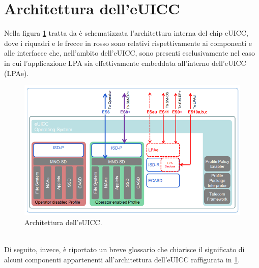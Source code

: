 \documentclass[10pt, twoside, openany]{book}
\begin{document}
\section{Architettura dell'eUICC}
Nella figura \ref{fig:eUICC-arch} tratta da \cite{GSMA-docs} è schematizzata l'architettura interna del chip eUICC, dove i riquadri e le frecce in rosso sono relativi rispettivamente ai componenti e alle interfacce che, nell'ambito dell'eUICC, sono presenti esclusivamente nel caso in cui l'applicazione LPA sia effettivamente embeddata all'interno dell'eUICC (LPAe).
\begin{figure}
\includegraphics[width=\linewidth]{eUICC-arch.png}
\caption{Architettura dell'eUICC.}
\label{fig:eUICC-arch}
\end{figure}
\\Di seguito, invece, è riportato un breve glossario che chiarisce il significato di alcuni componenti appartenenti all'architettura dell'eUICC raffigurata in \ref{fig:eUICC-arch}.
\end{document}
